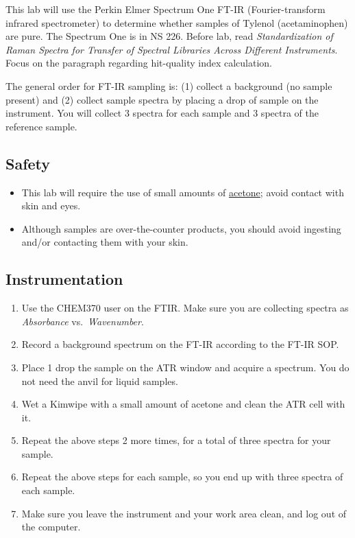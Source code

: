 \documentclass[]{tufte-book}
\providecommand{\tightlist}{%
  \setlength{\itemsep}{0pt}\setlength{\parskip}{0pt}}
\begin{document}
This lab will use the Perkin Elmer Spectrum One FT-IR (Fourier-transform infrared spectrometer) to determine whether samples of Tylenol (acetaminophen) are pure. The Spectrum One is in NS 226. Before lab, read \emph{Standardization of Raman Spectra for Transfer of Spectral Libraries Across Different Instruments}. Focus on the paragraph regarding hit-quality index calculation.

The general order for FT-IR sampling is: (1) collect a background (no sample present) and (2) collect sample spectra by placing a drop of sample on the instrument. You will collect 3 spectra for each sample and 3 spectra of the reference sample.

\hypertarget{safety-2}{%
\subsection*{Safety}\label{safety-2}}

\begin{itemize}
\tightlist
\item
  This lab will require the use of small amounts of \href{http://www.sciencelab.com/msds.php?msdsId=9927062}{acetone}; avoid contact with skin and eyes.
\item
  Although samples are over-the-counter products, you should avoid ingesting and/or contacting them with your skin.
\end{itemize}

\hypertarget{instrumentation-1}{%
\subsection{Instrumentation}\label{instrumentation-1}}

\begin{enumerate}
\def\labelenumi{\arabic{enumi}.}
\tightlist
\item
  Use the CHEM370 user on the FTIR. Make sure you are collecting spectra as \emph{Absorbance} vs.~\emph{Wavenumber}.
\item
  Record a background spectrum on the FT-IR according to the FT-IR SOP.
\item
  Place 1 drop the sample on the ATR window and acquire a spectrum. You do not need the anvil for liquid samples.
\item
  Wet a Kimwipe with a small amount of acetone and clean the ATR cell with it.
\item
  Repeat the above steps 2 more times, for a total of three spectra for your sample.
\item
  Repeat the above steps for each sample, so you end up with three spectra of each sample.
\item
  Make sure you leave the instrument and your work area clean, and log out of the computer.
\end{enumerate}
\end{document}
